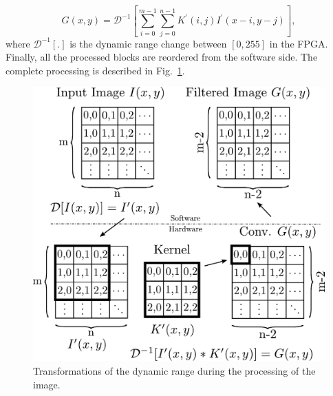 \documentclass[conference,compsoc]{IEEEtran}
\begin{document}
\begin{equation}\label{conv-org1}
  G(x,y) = \mathcal{D}^{-1}\left[\sum_{i=0}^{m-1} \sum_{j=0}^{n-1}K^\prime(i,j)I^\prime(x-i,y-j)\right],
\end{equation}
where $\mathcal{D}^{-1}[.]$ is the dynamic range change between $[0,255]$ in the
FPGA. Finally, all the processed blocks are reordered from the software side.
The complete processing is described in Fig.~\ref{transformation}.


\begin{figure}[!t]
\centering
\includegraphics[scale=0.47]{wflow3}
\caption{Transformations of the dynamic range during the processing of the image.}
\label{transformation}
\end{figure}



\end{document}
